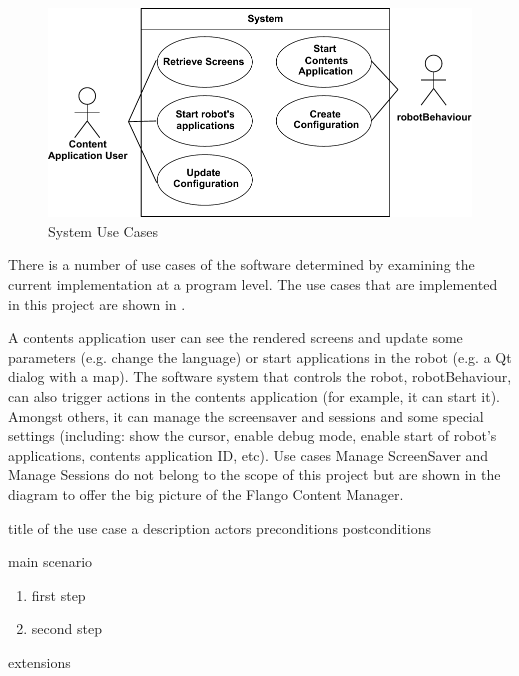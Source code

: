 \begin{figure}[htb]  
    \centering
    \includegraphics[width=\linewidth]{figures/specification-sucs}
    \caption{System Use Cases}
    \label{fig:specification-sucs}
\end{figure}

There is a number of use cases of the software determined by examining the current implementation at a program level.
The use cases that are implemented in this project are shown in .

A contents application user can see the rendered screens and update some parameters (e.g. change the language) or start applications in the robot (e.g. a Qt dialog with a map).
The software system that controls the robot, robotBehaviour, can also trigger actions in the contents application (for example, it can start it).
Amongst others, it can manage the screensaver and sessions and some special settings (including: show the cursor, enable debug mode, enable start of robot's applications, contents application ID, etc). 
Use cases Manage ScreenSaver and Manage Sessions do not belong to the scope of this project but are shown in the diagram to offer the big picture of the Flango Content Manager.

\begin{suc}
{title of the use case}
{a description}
{actors}
{preconditions}
{postconditions}
{main scenario
    \begin{enumerate}
        \item first step
        \item second step
    \end{enumerate}
}
{extensions}
\end{suc}

